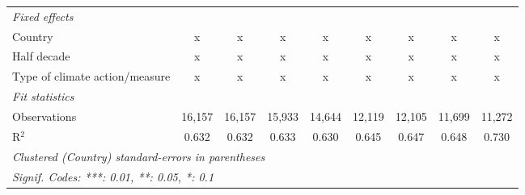 \begin{table}[htbp]
\begin{tabular}{lcccccccc}
      \emph{Fixed effects}\\
      Country                                                               & x            & x            & x           & x       & x             & x             & x             & x\\  
      Half decade                                                           & x            & x            & x           & x       & x             & x             & x             & x\\  
      Type of climate action/measure                                        & x            & x            & x           & x       & x             & x             & x             & x\\  
      \midrule \emph{Fit statistics}\\
      Observations                                                          & 16,157       & 16,157       & 15,933      & 14,644  & 12,119        & 12,105        & 11,699        & 11,272\\  
      R$^2$                                                                 & 0.632        & 0.632        & 0.633       & 0.630   & 0.645         & 0.647         & 0.648         & 0.730\\  
      \midrule
      \multicolumn{9}{l}{\emph{Clustered (Country) standard-errors in parentheses}}\\
      \multicolumn{9}{l}{\emph{Signif. Codes: ***: 0.01, **: 0.05, *: 0.1}}\\
   \end{tabular}
\end{table}


